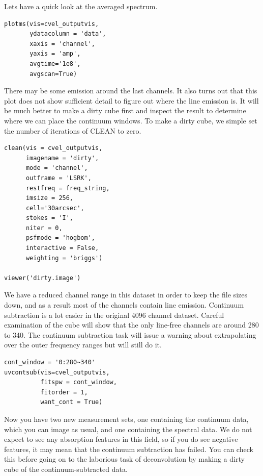 \documentclass[force,almostfull,justified]{tufte-book}
\begin{document}
Lets have a quick look at the averaged spectrum.

\begin{casacmd}
\begin{verbatim}
plotms(vis=cvel_outputvis, 
       ydatacolumn = 'data',
       xaxis = 'channel',
       yaxis = 'amp',
       avgtime='1e8',
       avgscan=True)
\end{verbatim}
\end{casacmd}

There may be some emission around the last channels. It also turns out that this plot does not show
sufficient detail to figure out where the line emission is.  It will be much better to make a dirty
cube first and inspect the result to determine where we can place the continuum windows. To make a
dirty cube, we simple set the number of iterations of CLEAN to zero.

\begin{casacmd}
\begin{verbatim}
clean(vis = cvel_outputvis,
      imagename = 'dirty',
      mode = 'channel',
      outframe = 'LSRK',
      restfreq = freq_string,
      imsize = 256,
      cell='30arcsec',
      stokes = 'I',
      niter = 0,
      psfmode = 'hogbom',
      interactive = False,
      weighting = 'briggs')

viewer('dirty.image')
\end{verbatim}
\end{casacmd}

We have a reduced channel range in this dataset in order to keep the file sizes down, and as a result
most of the channels contain line emission.  Continuum subtraction is a lot easier in the original
4096 channel dataset.  Careful examination of the cube will show that the only line-free channels are
around 280 to 340. The continuum subtraction task will issue a warning about extrapolating over the
outer frequency ranges but will still do it.

\begin{casacmd}
\begin{verbatim}
cont_window = '0:280~340'
uvcontsub(vis=cvel_outputvis,
          fitspw = cont_window,
          fitorder = 1,
          want_cont = True)
\end{verbatim}
\end{casacmd}

Now you have two new measurement sets, one containing the continuum data, which you can image as
usual, and one containing the spectral data.  We do not expect to see any absorption features in this
field, so if you do see negative features, it may mean that the continuum subtraction has failed. You
can check this before going on to the laborious task of deconvolution by making a dirty cube of the
continuum-subtracted data.
\end{document}
